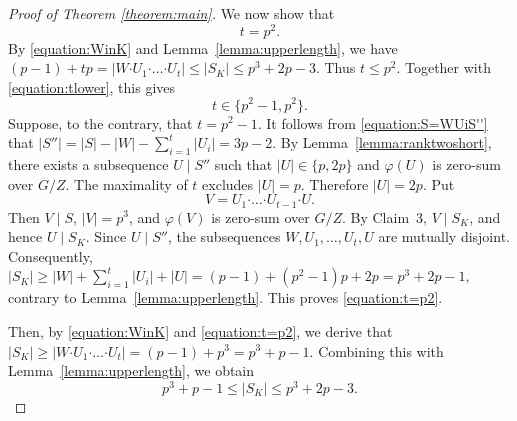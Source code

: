 \documentclass[a4paper, 12pt]{article}
\theoremstyle{definition}
\begin{document}
\begin{proof}[Proof of Theorem \ref{theorem:main}]
We now show that
\begin{equation}\label{equation:t=p2}
t=p^2.
\end{equation}
By \eqref{equation:WinK} and
Lemma~\ref{lemma:upperlength}, we have
$(p-1)+tp
=
\left|
W\boldsymbol{\cdot}U_1\boldsymbol{\cdot}\ldots
\boldsymbol{\cdot}U_t
\right|
\leq |S_K|
\leq p^3+2p-3.$
Thus $t\leq p^2$. Together with \eqref{equation:tlower}, this gives
$$
t\in\{p^2-1,p^2\}.
$$
Suppose, to the contrary, that $t=p^2-1$. It follows from
\eqref{equation:S=WUiS''} that
$|S''|=|S|-|W|-\sum_{i=1}^t|U_i|=3p-2.$
By Lemma~\ref{lemma:ranktwoshort}, there exists a subsequence
$U\mid S''$ such that $|U|\in\{p,2p\}$ and $\varphi(U)$ is
zero-sum over $G/Z$. The maximality of $t$ excludes $|U|=p$.
Therefore $|U|=2p$. Put
$$V=
U_1\boldsymbol{\cdot}\ldots
\boldsymbol{\cdot}U_{t-1}
\boldsymbol{\cdot}U.$$
Then $V\mid S$, $|V|=p^3$, and $\varphi(V)$ is zero-sum over
$G/Z$. By Claim~3, $V\mid S_K$, and hence $U\mid S_K$. Since
$U\mid S''$, the subsequences
$W,U_1,\ldots,U_t,U$ are mutually disjoint. Consequently,
$|S_K|
\ge |W|+\sum_{i=1}^{t}|U_i|+|U|=(p-1)+(p^2-1)p+2p=p^3+2p-1,$
contrary to Lemma~\ref{lemma:upperlength}. This proves \eqref{equation:t=p2}.

Then, by \eqref{equation:WinK} and \eqref{equation:t=p2}, we derive that
$|S_K|
\ge\left|
W\boldsymbol{\cdot}U_1\boldsymbol{\cdot}\ldots\boldsymbol{\cdot}U_t\right|=(p-1)+p^3=p^3+p-1.$
Combining this with Lemma~\ref{lemma:upperlength}, we obtain
\begin{equation}\label{equation:t}
p^3+p-1\leq |S_K|\leq p^3+2p-3.
\end{equation}




\end{proof}
\end{document}
